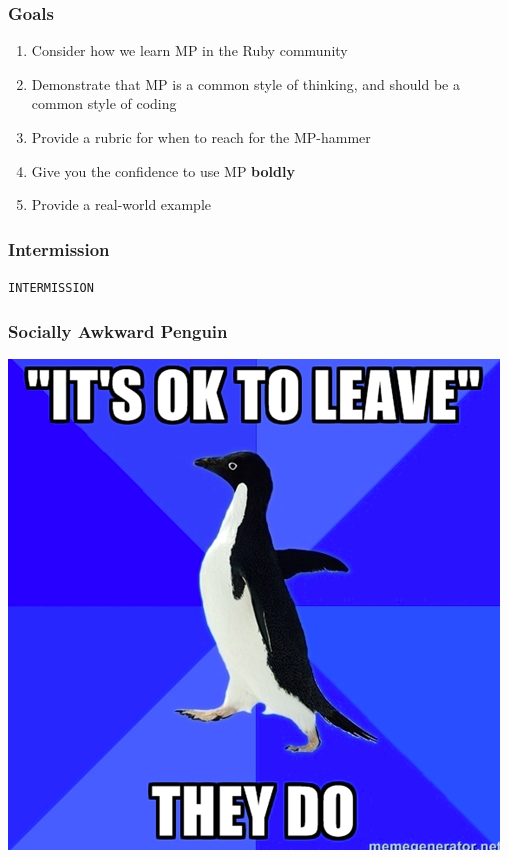 \documentclass[slidestop,compress,mathserif,notes]{beamer}
\begin{document}
\begin{frame}
	\frametitle{Goals}
	\begin{enumerate}
		\item Consider how we learn MP in the Ruby community
		\item Demonstrate that MP is a common style of thinking, and should be a common style of coding
		\item Provide a rubric for when to reach for the MP-hammer
		\item Give you the confidence to use MP \textbf{boldly}
		\item Provide a real-world example
	\end{enumerate}
\end{frame}

\begin{frame}
	\frametitle{Intermission}
	\begin{center}
		\texttt{INTERMISSION}
	\end{center}
\end{frame}

\begin{frame}
	\frametitle{Socially Awkward Penguin}
	\begin{center}
		\includegraphics[scale=0.3]{img/sap.png}			
	\end{center}	
\end{frame}
\end{document}
